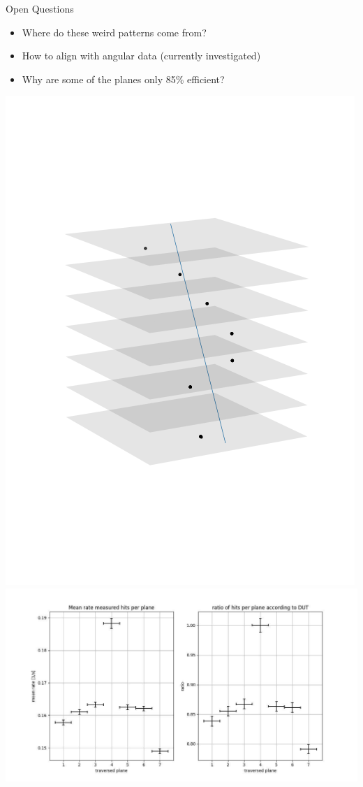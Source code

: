 \documentclass{beamer}
\begin{document}
\begin{frame}{Open Questions}
    \begin{minipage}{.75\textwidth}
	
    \begin{itemize}
	\setlength\itemsep{2.5em}
	\footnotesize
	\item Where do these weird patterns come from? 
	\item How to align with angular data (currently investigated)
	\item Why are some of the planes only 85\% efficient?
    \end{itemize}
    \end{minipage}
    \begin{minipage}{.24\textwidth}
	    \includegraphics[width=\textwidth]{Open_HighChi.png} \\
	    \includegraphics[trim=430 0 0 0, clip,width=.8\textwidth]{DavidFirstEff.jpg} \\
    \end{minipage}
\end{frame}
\end{document}
